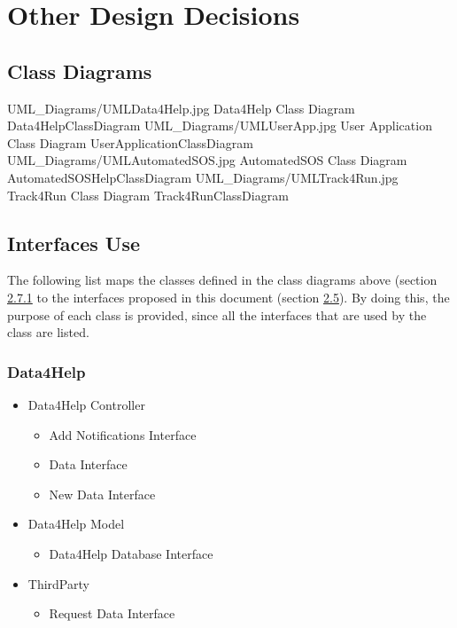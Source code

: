 \documentclass[../../DD.tex]{subfiles}
\begin{document}
\section{Other Design Decisions}
	\subsection{Class Diagrams\label{sect:2.7.1}}
	\image {13cm} {UML_Diagrams/UMLData4Help.jpg} {Data4Help Class Diagram} {Data4HelpClassDiagram}
	\image {13cm} {UML_Diagrams/UMLUserApp.jpg} {User Application Class Diagram} {UserApplicationClassDiagram}
	\image {13cm} {UML_Diagrams/UMLAutomatedSOS.jpg} {AutomatedSOS Class Diagram} {AutomatedSOSHelpClassDiagram}
	\image {13cm} {UML_Diagrams/UMLTrack4Run.jpg} {Track4Run Class Diagram} {Track4RunClassDiagram}

	\subsection{Interfaces Use}
		The following list maps the classes defined in the class diagrams above (section \hyperref[sect:2.7.1]{2.7.1} to the interfaces proposed in this document (section \hyperref[sect:2.5]{2.5}). By doing this, the purpose of each class is provided, since all the interfaces that are used by the class are listed.
		\subsubsection{Data4Help}
		
		\begin{itemize}
			\item Data4Help Controller
			\begin{itemize}
				\item Add Notifications Interface
				\item Data Interface
				\item New Data Interface
			\end{itemize}
			\item Data4Help Model
			\begin{itemize}
				\item Data4Help Database Interface
			\end{itemize}
			\item ThirdParty
			\begin{itemize}
				\item Request Data Interface
			\end{itemize}
		\end{itemize}
\end{document}

